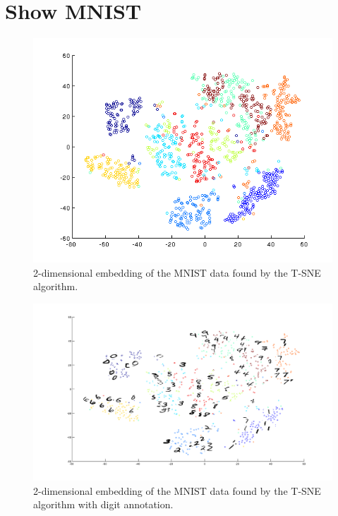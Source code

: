 \documentclass[a4paper, 12pt, titlepage]{article}
\begin{document}
\section{Show MNIST}

\begin{figure}[H]
	\centering
	\includegraphics[width=17cm]{images/MNIST_points_only.png}
	\caption{2-dimensional embedding of the MNIST data found by the T-SNE algorithm.}
\end{figure}

\begin{figure}[H]
	\centering
	\includegraphics[width=17cm]{images/MNIST.png}
	\caption{2-dimensional embedding of the MNIST data found by the T-SNE algorithm with digit annotation.}
\end{figure}
\end{document}
